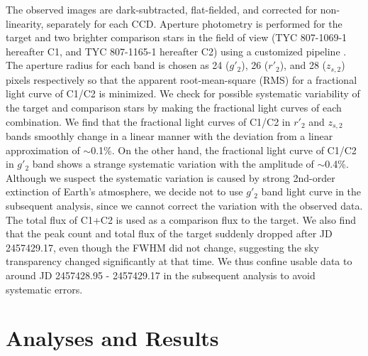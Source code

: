 \documentclass[]{pasj01}
\begin{document}
The observed images are dark-subtracted, flat-fielded, and corrected for 
non-linearity, separately for each CCD.
Aperture photometry is performed for the target and two brighter comparison stars in the field of view
(TYC 807-1069-1 hereafter C1, and TYC 807-1165-1 hereafter C2) using a customized pipeline \citep{2011PASJ...63..287F}.
The aperture radius for each band is chosen as 24 ($g'_2$), 26 ($r'_2$), and 28 ($z_{s,2}$) pixels
respectively so that the apparent root-mean-square (RMS)
for a fractional light curve of C1/C2 is minimized.
We check for possible systematic variability of the target and comparison stars
by making the fractional light curves of each combination.
We find that the fractional light curves of C1/C2 in $r'_2$ and $z_{s,2}$ bands smoothly
change in a linear manner with the deviation from a linear approximation of $\sim$0.1\%.
On the other hand, the fractional light curve of C1/C2 in $g'_2$ band shows
a strange systematic variation with the amplitude of $\sim$0.4\%.
Although we suspect the systematic variation is caused by
strong 2nd-order extinction of Earth's atmosphere,
we decide not to use $g'_2$ band light curve in the subsequent analysis,
since we cannot correct the variation with the observed data.
The total flux of C1+C2 is used as a comparison flux to the target.
We also find that the peak count and total flux of the target suddenly dropped
after JD 2457429.17, even though the FWHM did not change,
suggesting the sky transparency changed significantly at that time.
We thus confine usable data to around JD 2457428.95 - 2457429.17
in the subsequent analysis to avoid systematic errors.

\section{Analyses and Results}
\end{document}
